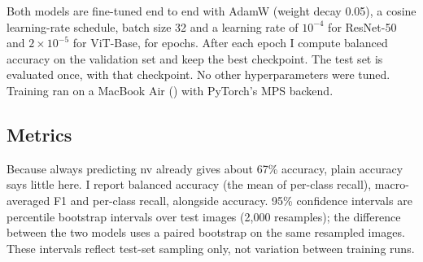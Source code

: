 Both models are fine-tuned end to end with AdamW (weight decay 0.05), a cosine learning-rate schedule, batch size 32 and a learning rate of $10^{-4}$ for ResNet-50 and $2\times10^{-5}$ for ViT-Base, for \resnetEpochs{} epochs.
After each epoch I compute balanced accuracy on the validation set and keep the best checkpoint.
The test set is evaluated once, with that checkpoint.
No other hyperparameters were tuned.
Training ran on a MacBook Air (\hardware) with PyTorch's MPS backend.

\subsection{Metrics}
Because always predicting nv already gives about 67\% accuracy, plain accuracy says little here.
I report balanced accuracy (the mean of per-class recall), macro-averaged F1 and per-class recall, alongside accuracy.
95\% confidence intervals are percentile bootstrap intervals over test images (2,000 resamples); the difference between the two models uses a paired bootstrap on the same resampled images.
These intervals reflect test-set sampling only, not variation between training runs.
